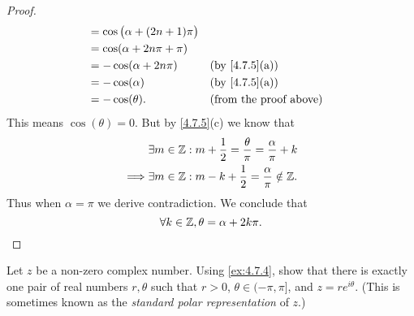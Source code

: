 \begin{proof}
\begin{align*}
                 & = \cos\big(\alpha + (2n + 1) \pi\big)                                    \\
                 & = \cos(\alpha + 2 n \pi + \pi)                                           \\
                 & = -\cos(\alpha + 2 n \pi)             &  & \text{(by \cref{4.7.5}(a))}   \\
                 & = -\cos(\alpha)                       &  & \text{(by \cref{4.7.5}(a))}   \\
                 & = -\cos(\theta).                      &  & \text{(from the proof above)}
  \end{align*}
  This means \(\cos(\theta) = 0\).
  But by \cref{4.7.5}(c) we know that
  \begin{align*}
             & \exists m \in \mathbb{Z} : m + \dfrac{1}{2} = \dfrac{\theta}{\pi} = \dfrac{\alpha}{\pi} + k \\
    \implies & \exists m \in \mathbb{Z} : m - k + \dfrac{1}{2} = \dfrac{\alpha}{\pi} \notin \mathbb{Z}.
  \end{align*}
  Thus when \(\alpha = \pi\) we derive contradiction.
  We conclude that
  \[
    \forall k \in \mathbb{Z}, \theta = \alpha + 2 k \pi.
  \]
\end{proof}

\begin{ex}\label{ex:4.7.6}
  Let \(z\) be a non-zero complex number.
  Using \cref{ex:4.7.4}, show that there is exactly one pair of real numbers \(r, \theta\) such that \(r > 0\), \(\theta \in (-\pi, \pi]\), and \(z = r e^{i \theta}\).
  (This is sometimes known as the \emph{standard polar representation} of \(z\).)
\end{ex}

